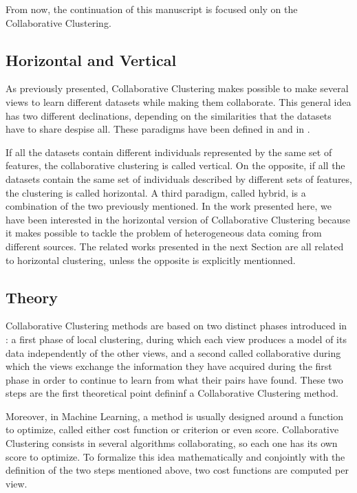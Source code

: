 \documentclass[a4paper]{report}
\begin{document}
    From now, the continuation of this manuscript is focused only on the Collaborative Clustering.

    \subsection{Horizontal and Vertical}

    As previously presented, Collaborative Clustering makes possible to make several views to learn different datasets while making them collaborate. This general idea has two different declinations, depending on the similarities that the datasets have to share despise all. These paradigms have been defined in \cite{pedrycz2005knowledge} and in \cite{grozavu2010topological}.

    If all the datasets contain different individuals represented by the same set of features, the collaborative clustering is called vertical. On the opposite, if all the datasets contain the same set of individuals described by different sets of features, the clustering is called horizontal. A third paradigm, called hybrid, is a combination of the two previously mentioned. In the work presented here, we have been interested in the horizontal version of Collaborative Clustering because it makes possible to tackle the problem of heterogeneous data coming from different sources. The related works presented in the next Section are all related to horizontal clustering, unless the opposite is explicitly mentionned.

    \subsection{Theory}
    
    Collaborative Clustering methods are based on two distinct phases introduced in \cite{pedrycz2002collaborative} : a first phase of local clustering, during which each view produces a model of its data independently of the other views, and a second called collaborative during which the views exchange the information they have acquired during the first phase in order to continue to learn from what their pairs have found. These two steps are the first theoretical point defininf a Collaborative Clustering method.

    Moreover, in Machine Learning, a method is usually designed around a function to optimize, called either cost function or criterion or even score. Collaborative Clustering consists in several algorithms collaborating, so each one has its own score to optimize. To formalize this idea mathematically and conjointly with the definition of the two steps mentioned above, two cost functions are computed per view.
\end{document}
